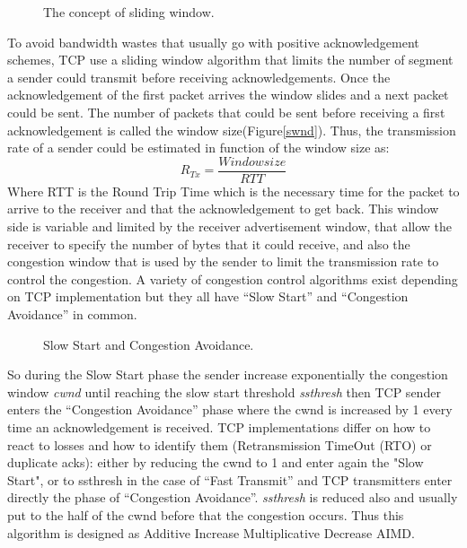  \begin{figure}[h]
  \begin{center}
\caption{
  The concept of sliding window.
    \label{fig:swnd}
}
 \end{center}
\end{figure}

To avoid bandwidth wastes that usually go with positive acknowledgement schemes, TCP use a sliding window algorithm that limits the number of segment a sender could transmit before receiving acknowledgements. Once the acknowledgement of the first packet arrives the window slides and a next packet could be sent. The number of packets that could be sent before receiving a first acknowledgement is called the window size(Figure\ref{swnd}). Thus, the transmission rate of a sender could be estimated in function of the window size as:
\begin{equation}
R_{Tx} = \frac{Window size}{RTT}
\end{equation}
Where RTT is the Round Trip Time which is the necessary time for the packet to arrive to the receiver and that the acknowledgement to get back. This window side is variable and limited by the receiver advertisement window, that allow the receiver to specify the number of bytes that it could receive, and also the congestion window that is used by the sender to limit the transmission rate to control the congestion. A variety of congestion control algorithms exist depending on TCP implementation but they all have “Slow Start” and “Congestion Avoidance” in common. 

 \begin{figure}[h]
  \begin{center}
\caption{
  Slow Start and Congestion Avoidance.
    \label{fig:SSCA}
}
 \end{center}
\end{figure}

So during the Slow Start phase the sender increase exponentially the congestion window {\it cwnd} until reaching the slow start threshold {\it ssthresh} then TCP sender enters the “Congestion Avoidance” phase where the cwnd is increased by 1 every time an acknowledgement is received.
TCP implementations differ on how to react to losses and how to identify them (Retransmission TimeOut (RTO) or duplicate acks): either by reducing the cwnd to 1 and enter again the "Slow Start", or to ssthresh in the case of “Fast Transmit” and TCP transmitters enter directly the phase of  “Congestion Avoidance”. {\it ssthresh} is reduced also and usually put to the half of the cwnd before that the congestion occurs. Thus this algorithm is designed as Additive Increase Multiplicative Decrease AIMD. 

